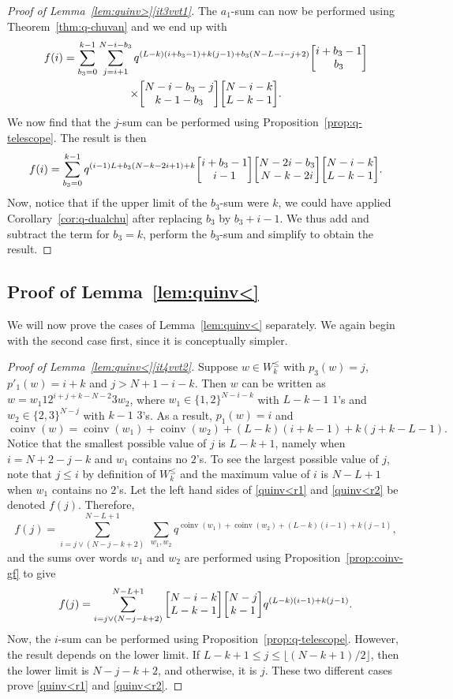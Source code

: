 \documentclass[ALCO,Unicode]{cedram}
\DeclareMathOperator{\coinv}{coinv}
\newcommand{\qbinom}[2]{\bgroup\renewcommand*{\arraystretch}{1}\begin{bmatrix} #1 \\ #2\end{bmatrix} \egroup}
\begin{document}
\begin{proof}[Proof of Lemma~\ref{lem:quinv>}\ref{it3vvt1}]
The $a_1$-sum can now be performed using Theorem~\ref{thm:q-chuvan} and we end up with
\begin{multline*}
f(i) = \sum_{b_3 = 0}^{k-1}   \sum_{j=i+1}^{N-i-b_3} q^{(L-k)(i+b_3-1) + k(j-1) + b_3(N-L-i-j+2)} \qbinom{i+b_3-1}{b_3} \\
\times \qbinom {N-i-b_3-j}{k-1-b_3}  \qbinom {N-i-k}{L-k-1} .
\end{multline*}
We now find that the $j$-sum can be performed using Proposition~\ref{prop:q-telescope}.  The result is then
\[
f(i) = \sum_{b_3 = 0}^{k-1}  q^{(i-1)L + b_3(N-k-2i+1) + k} 
\qbinom{i+b_3-1}{i-1} \qbinom {N-2i-b_3}{N-k-2i} 
\qbinom {N-i-k}{L-k-1} .
\]
Now, notice that if the upper limit of the $b_3$-sum were $k$, we could have applied
Corollary~\ref{cor:q-dualchu} after replacing $b_3$ by $b_3+i-1$.  We thus add and subtract 
the term for $b_3 = k$, perform the $b_3$-sum and simplify to obtain the result.
\end{proof}



\subsection{Proof of Lemma~\ref{lem:quinv<}}
We will now prove the cases of Lemma~\ref{lem:quinv<} separately.
We again begin with the second case first, since it is conceptually simpler.


\begin{proof}[Proof of Lemma~\ref{lem:quinv<}\ref{it4vvt2}]
Suppose $w \in  W_k^\leq$ with $p_3(w) = j$, $p'_1(w) = i+k$ and $j > N+1 - i-k$. Then
$w$ can be written as $w = w_1 1 2^{i+j+k-N-2} 3 w_2$, where $w_1 \in \{1,2\}^{N-i-k}$ with $L-k-1$ $1$'s
and $w_2 \in \{2,3\}^{N-j}$ with $k-1$ $3$'s. As a result, $p_1(w) = i$ and
\[
\coinv(w) = \coinv(w_1) + \coinv(w_2) + (L-k)(i+k-1) + k(j+k-L-1).
\]
Notice that the smallest possible value of $j$ is $L-k+1$, namely when $i = N+2-j-k$ and $w_1$ contains no $2$'s. To see the  largest possible value of $j$,  note that $j \leq i$ by definition of $W_k^\leq$ and the maximum value of $i$ is $N-L+1$ when $w_1$ contains no $2$'s. Let the left hand sides of \eqref{quinv<r1} and \eqref{quinv<r2} be denoted $f(j)$.
Therefore,
\[
f(j) = \sum_{i=j \vee (N-j-k+2)}^{N-L+1}\ \sum_{w_1,w_2} q^{\coinv(w_1) + \coinv(w_2) + (L-k)(i-1) + k(j-1)},
\]
and the sums over words $w_1$ and $w_2$ are performed using Proposition~\ref{prop:coinv-gf} to give
\[
f(j) = \sum_{i=j \vee (N-j-k+2)}^{N-L+1} \qbinom {N-i-k}{L-k-1} \qbinom{N-j}{k-1} q^{ (L-k)(i-1) + k(j-1)}.
\]
Now, the $i$-sum can be performed using Proposition~\ref{prop:q-telescope}. However, the result depends on 
the lower limit. If $L-k+1 \leq j \leq \lfloor (N-k+1)/2 \rfloor$, then the lower limit is $N-j-k+2$, and otherwise,
it is $j$. These two different cases prove \eqref{quinv<r1} and \eqref{quinv<r2}.
\end{proof}
\end{document}
